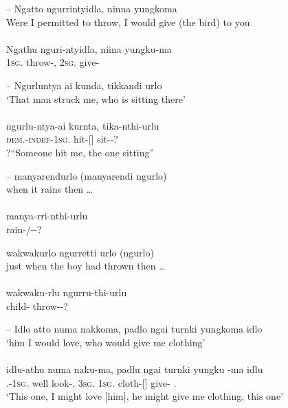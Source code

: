 \documentclass{langscibook}
\begin{document}
\begin{xlist}
--
\ea\label{ex:5:30}
Ngatto     ngurrintyidla,     ninna           yungkoma \\
\glt Were I permitted to throw, I would give (the bird) to you \\
\citep[19]{teichelmann_outlines_1840} \\
\gll Ngathu	 nguri-ntyidla,      niina           yungku-ma \\
1\textsc{sg}.  throw-,     2\textsc{sg}.     give-\\
\z




--
\ea\label{ex:5:31}
Ngurluntya      ai                   kunda,           tikkandi	urlo \\
\glt `That man struck me, who is sitting there' \\
\citep[13]{teichelmann_outlines_1840} \\
\gll ngurlu-ntya-ai		 kurnta,          tika-nthi-urlu \\
\textsc{dem}.-\textsc{indef}-1\textsc{sg}.    hit-[]    sit--?\\
\glt ?“Someone hit me, the one sitting”
\z



--
\ea\label{ex:5:32}
manyarendurlo (manyarendi ngurlo) \\
when it rains then …  \\
\citep{teichelmann_verb_1858} \\
\gll manya-rri-nthi-urlu \\
rain-/--?                        \\
\z

\ea\label{ex:5:33}
wakwakurlo ngurretti urlo (ngurlo) \\
\glt just when the boy had thrown then … \\
\citep{teichelmann_verb_1858} \\
\gll wakwaku-rlu     ngurru-thi-urlu \\
child-         throw--?                    \\
\z

		

		
--
\ea\label{ex:5:34}
Idlo  atto          numa     nakkoma,       padlo        ngai      turnki              yungkoma        idlo \\
\glt `him I would love, who would give me clothing' \\
\citep[13]{teichelmann_outlines_1840} \\
\gll idlu-athu              numa   naku-ma,     padlu     ngai     turnki        yungku -ma  idlu \\
.-1\textsc{sg}.  well        look-,    3\textsc{sg}.   1\textsc{sg}.  cloth-[]  give-    .                              \\
\glt `This one, I might love [him], he might give me clothing, this one'
\z



\end{xlist}
\end{document}
